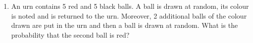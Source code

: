 \renewcommand{\theequation}{\theenumi}
\begin{enumerate}[label=\thesection.\arabic*.,ref=\thesection.\theenumi]
\item An urn contains 5 red and 5 black balls. A ball
is drawn at random, its colour is noted and
is returned to the urn. Moreover, 2 additional
balls of the colour drawn are put in the urn
and then a ball is drawn at random. What is
the probability that the second ball is red?

\end{enumerate}